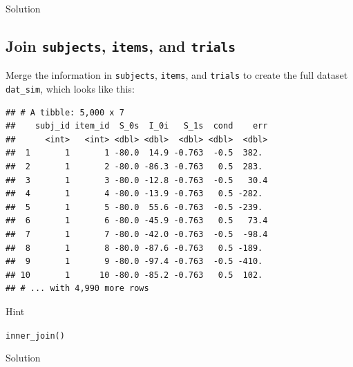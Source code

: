 \documentclass[]{book}
\newenvironment{Shaded}{\begin{snugshade}}{\end{snugshade}}
\newcommand{\DataTypeTok}[1]{\textcolor[rgb]{0.13,0.29,0.53}{#1}}
\newcommand{\DecValTok}[1]{\textcolor[rgb]{0.00,0.00,0.81}{#1}}
\newcommand{\KeywordTok}[1]{\textcolor[rgb]{0.13,0.29,0.53}{\textbf{#1}}}
\newcommand{\NormalTok}[1]{#1}
\newcommand{\OperatorTok}[1]{\textcolor[rgb]{0.81,0.36,0.00}{\textbf{#1}}}
\newcommand{\StringTok}[1]{\textcolor[rgb]{0.31,0.60,0.02}{#1}}
\begin{document}
Solution

\begin{Shaded}
\end{Shaded}

\hypertarget{join-subjects-items-and-trials}{%
\subsection{\texorpdfstring{Join \texttt{subjects}, \texttt{items}, and \texttt{trials}}{Join subjects, items, and trials}}\label{join-subjects-items-and-trials}}

Merge the information in \texttt{subjects}, \texttt{items}, and \texttt{trials} to create the full dataset \texttt{dat\_sim}, which looks like this:

\begin{verbatim}
## # A tibble: 5,000 x 7
##    subj_id item_id  S_0s  I_0i   S_1s  cond    err
##      <int>   <int> <dbl> <dbl>  <dbl> <dbl>  <dbl>
##  1       1       1 -80.0  14.9 -0.763  -0.5  382. 
##  2       1       2 -80.0 -86.3 -0.763   0.5  283. 
##  3       1       3 -80.0 -12.8 -0.763  -0.5   30.4
##  4       1       4 -80.0 -13.9 -0.763   0.5 -282. 
##  5       1       5 -80.0  55.6 -0.763  -0.5 -239. 
##  6       1       6 -80.0 -45.9 -0.763   0.5   73.4
##  7       1       7 -80.0 -42.0 -0.763  -0.5  -98.4
##  8       1       8 -80.0 -87.6 -0.763   0.5 -189. 
##  9       1       9 -80.0 -97.4 -0.763  -0.5 -410. 
## 10       1      10 -80.0 -85.2 -0.763   0.5  102. 
## # ... with 4,990 more rows
\end{verbatim}

Hint

\texttt{inner\_join()}

Solution

\begin{Shaded}
\end{Shaded}
\end{document}
